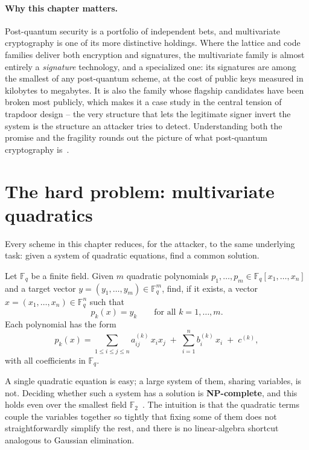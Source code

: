 \paragraph{Why this chapter matters.}
Post-quantum security is a portfolio of independent bets, and multivariate cryptography is one of its more distinctive holdings. Where the lattice and code families deliver both encryption and signatures, the multivariate family is almost entirely a \emph{signature} technology, and a specialized one: its signatures are among the smallest of any post-quantum scheme, at the cost of public keys measured in kilobytes to megabytes. It is also the family whose flagship candidates have been broken most publicly, which makes it a case study in the central tension of trapdoor design -- the very structure that lets the legitimate signer invert the system is the structure an attacker tries to detect. Understanding both the promise and the fragility rounds out the picture of what post-quantum cryptography is~\cite{bernstein2009}.

\section{The hard problem: multivariate quadratics}

Every scheme in this chapter reduces, for the attacker, to the same underlying task: given a system of quadratic equations, find a common solution.

\begin{definition}
Let $\mathbb{F}_q$ be a finite field. Given $m$ quadratic polynomials $p_1,\dots,p_m \in \mathbb{F}_q[x_1,\dots,x_n]$ and a target vector $y = (y_1,\dots,y_m) \in \mathbb{F}_q^m$, find, if it exists, a vector $x = (x_1,\dots,x_n) \in \mathbb{F}_q^n$ such that
\[
p_k(x) = y_k \qquad \text{for all } k = 1,\dots,m .
\]
Each polynomial has the form
\[
p_k(x) = \sum_{1 \le i \le j \le n} a^{(k)}_{ij}\, x_i x_j \;+\; \sum_{i=1}^{n} b^{(k)}_i\, x_i \;+\; c^{(k)} ,
\]
with all coefficients in $\mathbb{F}_q$.
\end{definition}

A single quadratic equation is easy; a large system of them, sharing variables, is not. Deciding whether such a system has a solution is \textbf{NP-complete}, and this holds even over the smallest field $\mathbb{F}_2$~\cite{ding2006}. The intuition is that the quadratic terms couple the variables together so tightly that fixing some of them does not straightforwardly simplify the rest, and there is no linear-algebra shortcut analogous to Gaussian elimination.

